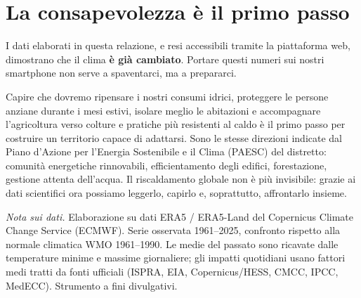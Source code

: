 \documentclass[11pt,a4paper]{article}
\begin{document}
\section{La consapevolezza è il primo passo}
I dati elaborati in questa relazione, e resi accessibili tramite la piattaforma web, dimostrano che il clima \textbf{è già cambiato}. Portare questi numeri sui nostri smartphone non serve a spaventarci, ma a prepararci.

Capire che dovremo ripensare i nostri consumi idrici, proteggere le persone anziane durante i mesi estivi, isolare meglio le abitazioni e accompagnare l'agricoltura verso colture e pratiche più resistenti al caldo è il primo passo per costruire un territorio capace di adattarsi. Sono le stesse direzioni indicate dal Piano d'Azione per l'Energia Sostenibile e il Clima (PAESC) del distretto: comunità energetiche rinnovabili, efficientamento degli edifici, forestazione, gestione attenta dell'acqua. Il riscaldamento globale non è più invisibile: grazie ai dati scientifici ora possiamo leggerlo, capirlo e, soprattutto, affrontarlo insieme.

\vspace{0.4cm}
\noindent\footnotesize\textit{Nota sui dati.} Elaborazione su dati ERA5 / ERA5-Land del Copernicus Climate Change Service (ECMWF). Serie osservata 1961--2025, confronto rispetto alla normale climatica WMO 1961--1990. Le medie del passato sono ricavate dalle temperature minime e massime giornaliere; gli impatti quotidiani usano fattori medi tratti da fonti ufficiali (ISPRA, EIA, Copernicus/HESS, CMCC, IPCC, MedECC). Strumento a fini divulgativi.
\end{document}
